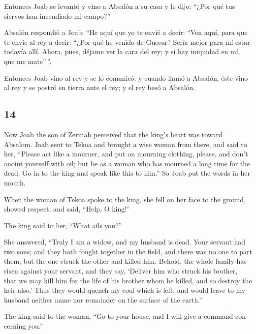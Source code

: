 \begin{paracol}{2}
 Entonces Joab se levantó y vino a Absalón a su casa y le
dijo: ``¿Por qué tus siervos han incendiado mi campo?''

 Absalón respondió a Joab: ``He aquí que yo te envié a
decir: ``Ven aquí, para que te envíe al rey a decir: ``¿Por qué he
venido de Guesur? Sería mejor para mí estar todavía allí. Ahora, pues,
déjame ver la cara del rey; y si hay iniquidad en mí, que me mate''\,''.

 Entonces Joab vino al rey y se lo comunicó; y cuando
llamó a Absalón, éste vino al rey y se postró en tierra ante el rey; y
el rey besó a Absalón.

\switchcolumn
\begin{otherlanguage}{english}

\hypertarget{section-27}{%
\section{14}\label{section-27}}

 Now Joab the son of Zeruiah perceived that the king's
heart was toward Absalom.  Joab sent to Tekoa and brought
a wise woman from there, and said to her, ``Please act like a mourner,
and put on mourning clothing, please, and don't anoint yourself with
oil; but be as a woman who has mourned a long time for the dead.
 Go in to the king and speak like this to him.'' So Joab
put the words in her mouth.

 When the woman of Tekoa spoke to the king, she fell on
her face to the ground, showed respect, and said, ``Help, O king!''

 The king said to her, ``What ails you?''

She answered, ``Truly I am a widow, and my husband is dead.
 Your servant had two sons; and they both fought together
in the field, and there was no one to part them, but the one struck the
other and killed him.  Behold, the whole family has risen
against your servant, and they say, `Deliver him who struck his brother,
that we may kill him for the life of his brother whom he killed, and so
destroy the heir also.' Thus they would quench my coal which is left,
and would leave to my husband neither name nor remainder on the surface
of the earth.''

 The king said to the woman, ``Go to your house, and I
will give a command concerning you.''


\end{otherlanguage}
\end{paracol}
